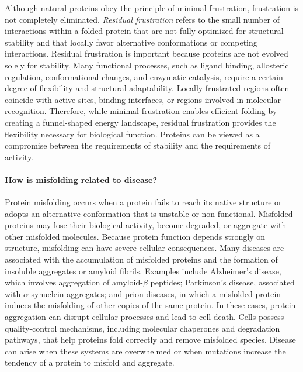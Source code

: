 Although natural proteins obey the principle of minimal frustration, frustration is not completely eliminated. \emph{Residual frustration} refers to the small number of interactions within a folded protein that are not fully optimized for structural stability and that locally favor alternative conformations or competing interactions.
Residual frustration is important because proteins are not evolved solely for stability. Many functional processes, such as ligand binding, allosteric regulation, conformational changes, and enzymatic catalysis, require a certain degree of flexibility and structural adaptability. Locally frustrated regions often coincide with active sites, binding interfaces, or regions involved in molecular recognition.
Therefore, while minimal frustration enables efficient folding by creating a funnel-shaped energy landscape, residual frustration provides the flexibility necessary for biological function. Proteins can be viewed as a compromise between the requirements of stability and the requirements of activity.

\paragraph{How is misfolding related to disease?}

Protein misfolding occurs when a protein fails to reach its native structure or adopts an alternative conformation that is unstable or non-functional. Misfolded proteins may lose their biological activity, become degraded, or aggregate with other misfolded molecules. Because protein function depends strongly on structure, misfolding can have severe cellular consequences.
Many diseases are associated with the accumulation of misfolded proteins and the formation of insoluble aggregates or amyloid fibrils. Examples include Alzheimer's disease, which involves aggregation of amyloid-$\beta$ peptides; Parkinson's disease, associated with $\alpha$-synuclein aggregates; and prion diseases, in which a misfolded protein induces the misfolding of other copies of the same protein. In these cases, protein aggregation can disrupt cellular processes and lead to cell death.
Cells possess quality-control mechanisms, including molecular chaperones and degradation pathways, that help proteins fold correctly and remove misfolded species. Disease can arise when these systems are overwhelmed or when mutations increase the tendency of a protein to misfold and aggregate.